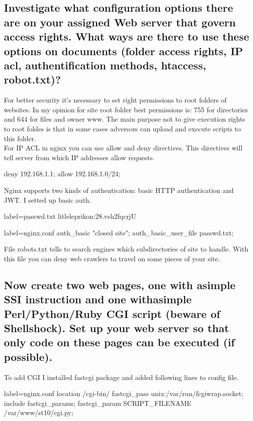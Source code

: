\documentclass[a4paper,11pt]{article}
\begin{document}
\subsection{Investigate what configuration options there are on your assigned Web server that govern access rights. What ways are there to use these options on documents (folder access rights, IP acl, authentification methods, htaccess, robot.txt)?}
For better security it's necessary to set right permissions to root folders of websites. In my opinion for site root folder best permissions is: 755 for directories and 644 for files and owner www. The main purpose not to give execution rights to root foldes is that in some cases adversors can upload and execute scripts to this folder.\\
For IP ACL in nginx you can use allow and deny directives. This directives will tell server from which IP addresses allow requests.
\begin{nginxcode}
deny  192.168.1.1;
allow 192.168.1.0/24;
\end{nginxcode}
Nginx supports two kinds of authentication: basic HTTP authentication and JWT. I setted up basic auth.

\begin{bashcode*}{label=passwd.txt}
litleleprikon:28.vsh2fqcrjU
\end{bashcode*}

\begin{nginxcode*}{label=nginx.conf}
auth_basic           "closed site";
auth_basic_user_file passwd.txt;
\end{nginxcode*}
File robots.txt tells to search engines which subdirectories of site to handle. With this file you can deny web crawlers to travel on some pieces of your site.


\subsection{Now create two web pages, one with asimple SSI instruction and one withasimple Perl/Python/Ruby CGI script (beware of Shellshock). Set up your web server so that only code on these pages can be executed (if possible).}

To add CGI I installed fastcgi package and added following lines to config file.
\begin{nginxcode*}{label=nginx.conf}
location /cgi-bin/ {
        fastcgi_pass unix:/var/run/fcgiwrap.socket;
        include fastcgi_params;
        fastcgi_param SCRIPT_FILENAME /var/www/st10/cgi.py;
}
\end{nginxcode*}
\end{document}
